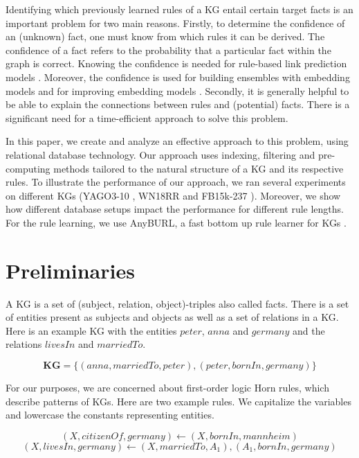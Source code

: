 \documentclass[english]{lni}
\begin{document}
Identifying which previously learned rules of a KG entail certain target facts is an important problem for two main reasons. Firstly, to determine the confidence of an (unknown) fact, one must know from which rules it can be derived. The confidence of a fact refers to the probability that a particular fact within the graph is correct. Knowing the confidence is needed for rule-based link prediction models \cite{AnyBURL19}. Moreover, the confidence is used for building ensembles with embedding models \cite{RuleEmbeddingCombination1} and for improving embedding models \cite{RuleEmbeddingCombination2}. Secondly, it is generally helpful to be able to explain the connections between rules and (potential) facts. There is a significant need for a time-efficient approach to solve this problem. 


In this paper, we create and analyze an effective approach to this problem, using relational database technology. Our approach uses indexing, filtering and pre-computing methods tailored to the natural structure of a KG and its respective rules. To illustrate the performance of our approach, we ran several experiments on different KGs (YAGO3-10 \cite{YAGO3}, WN18RR \cite{WN18RR} and FB15k-237 \cite{FB15k-237}). Moreover, we show how different database setups impact the performance for different rule lengths. For the rule learning, we use AnyBURL, a fast bottom up rule learner for KGs \cite{AnyBURL19}.

\section{Preliminaries} 
A KG is a set of (subject, relation, object)-triples also called facts. There is a set of entities present as subjects and objects as well as a set of relations in a KG. Here is an example KG with the entities \(peter\), \(anna\) and \(germany\) and the relations \(livesIn\) and \(marriedTo\).

\begin{equation*} \label{eq:knowledgegraph}
\textbf{KG} = \{(anna,marriedTo, peter), (peter,bornIn,germany)\}\end{equation*}

For our purposes, we are concerned about first-order logic Horn rules, which describe patterns of KGs. Here are two example rules. We capitalize the variables and lowercase the constants representing entities.

\begin{equation} \label{eq:rule_1}
(X, citizenOf, germany) \leftarrow (X, bornIn, mannheim) 
\end{equation} 
\begin{equation} \label{eq:rule_2}
(X, livesIn, germany) \leftarrow (X, marriedTo, A_1), (A_1, bornIn, germany)
\end{equation}
\end{document}
